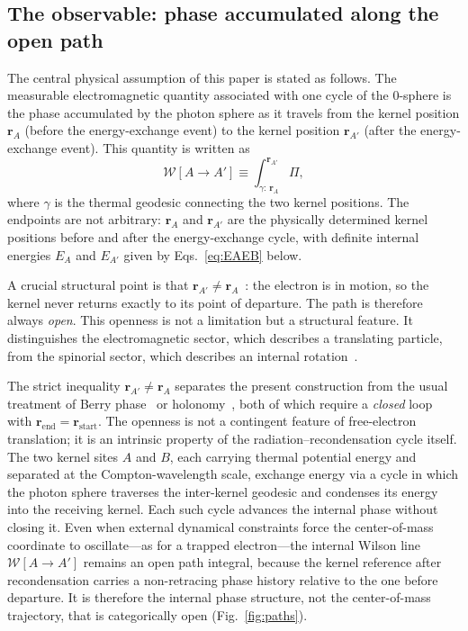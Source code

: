 \documentclass[%
 reprint, amsmath,amssymb, aps, prb, ]{revtex4-2}
\numberwithin{equation}{section}
\newcommand{\WL}{\mathcal{W}}
\begin{document}
\subsection{The observable: phase accumulated along the open path}
\label{sec:obs}

The central physical assumption of this paper is stated as follows. The measurable electromagnetic quantity associated with one cycle of the 0-sphere is the phase accumulated by the photon sphere as it travels from the kernel position $\mathbf{r}_A$ (before the energy-exchange event) to the kernel position $\mathbf{r}_{A'}$ (after the energy-exchange event). This quantity is written as
\begin{equation}
\WL[A \to A'] \equiv \int_{\gamma:\,\mathbf{r}_A}^{\mathbf{r}_{A'}} \Pi,
\label{eq:WL}
\end{equation}
where $\gamma$ is the thermal geodesic connecting the two kernel positions. The endpoints are not arbitrary: $\mathbf{r}_A$ and $\mathbf{r}_{A'}$ are the physically determined kernel positions before and after the energy-exchange cycle, with definite internal energies $E_A$ and $E_{A'}$ given by Eqs.~\eqref{eq:EAEB} below.

A crucial structural point is that $\mathbf{r}_{A'} \neq \mathbf{r}_A$~\cite{hanamura47}: the electron is in motion, so the kernel never returns exactly to its point of departure. The path is therefore always \emph{open}. This openness is not a limitation but a structural feature. It distinguishes the electromagnetic sector, which describes a translating particle, from the spinorial sector, which describes an internal rotation~\cite{hanamura26,hanamura45}.

The strict inequality $\mathbf{r}_{A'}\neq\mathbf{r}_A$ separates the present construction from the usual treatment of Berry phase~\cite{Berry1984} or holonomy~\cite{WuYang1975}, both of which require a \emph{closed} loop with $\mathbf{r}_{\text{end}}=\mathbf{r}_{\text{start}}$. The openness is not a contingent feature of free-electron translation; it is an intrinsic property of the radiation--recondensation cycle itself. The two kernel sites $A$ and $B$, each carrying thermal potential energy and separated at the Compton-wavelength scale, exchange energy via a cycle in which the photon sphere traverses the inter-kernel geodesic and condenses its energy into the receiving kernel. Each such cycle advances the internal phase without closing it. Even when external dynamical constraints force the center-of-mass coordinate to oscillate---as for a trapped electron---the internal Wilson line $\WL[A\to A']$ remains an open path integral, because the kernel reference after recondensation carries a non-retracing phase history relative to the one before departure. It is therefore the internal phase structure, not the center-of-mass trajectory, that is categorically open (Fig.~\ref{fig:paths}).
\end{document}
